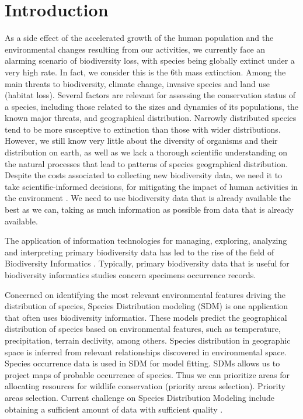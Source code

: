 \chapter{Introduction}\label{introduction}

As a side effect of the accelerated growth of the human population and the environmental changes resulting from our activities, we currently face an alarming scenario of biodiversity loss, with species being globally extinct under a very high rate. 
In fact, we consider this is the 6th mass extinction. %
Among the main threats to biodiversity, climate change, invasive species and land use (habitat loss).
%
Several factors are relevant for assessing the conservation status of a species, including those related to the sizes and dynamics of its populations, the known major threats, and geographical distribution. %
Narrowly distributed species tend to be more susceptive to extinction than those with wider distributions.
However, we still know very little about the diversity of organisms and their distribution on earth, as well as we lack a thorough scientific understanding on the natural processes that lead to patterns of species geographical distribution.
Despite the costs associated to collecting new biodiversity data, we need it to take scientific-informed decisions, for mitigating the impact of human activities in the environment \cite{Dozzier_4paradigm_2009, Funk1999}.
We need to use biodiversity data that is already available the best as we can, taking as much information as possible from data that is already available.

The application of information technologies for managing, exploring, analyzing and interpreting primary biodiversity data has led to the rise of the field of Biodiversity Informatics \cite{Soberon2004}.
Typically, primary biodiversity data that is useful for biodiversity informatics studies concern specimens occurrence records.

Concerned on identifying the most relevant environmental features driving the distribution of species, Species Distribution modeling (SDM) is one application that often uses biodiversity informatics.
These models predict the geographical distribution of species based on environmental features, such as temperature, precipitation, terrain declivity, among others.
Species distribution in geographic space is inferred from relevant relationships discovered in environmental space.
Species occurrence data is used in SDM for model fitting. 
SDMs allows us to project maps of probable occurrence of species.
Thus we can prioritize areas for allocating resources for wildlife conservation (priority areas selection).
Priority areas selection. %
Current challenge on Species Distribution Modeling include obtaining a sufficient amount of data with sufficient quality \cite{Araujo2006}.


